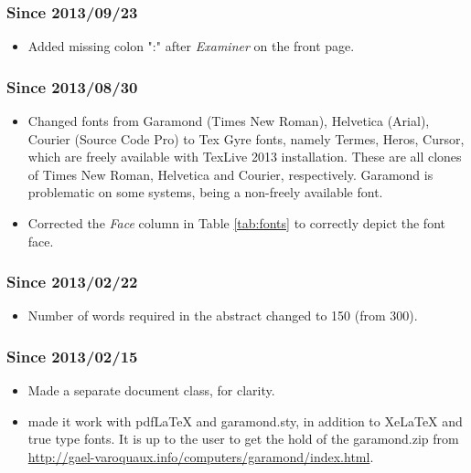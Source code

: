 \documentclass{cslthse-msc}
\begin{document}
\begin{appendices}
\subsubsection{Since 2013/09/23}
\begin{itemize}
\item Added missing colon ":" after \textit{Examiner} on the front page. 
\end{itemize}

\subsubsection{Since 2013/08/30}
\begin{itemize}
\item Changed fonts from Garamond (Times New Roman), Helvetica (Arial), Courier (Source Code Pro) to Tex Gyre fonts, namely Termes, Heros, Cursor, which are freely available with TexLive 2013 installation. These are all clones of Times New Roman, Helvetica and Courier, respectively. Garamond is problematic on some systems, being a non-freely available font.
\item Corrected the \textit{Face} column in Table \ref{tab:fonts} to correctly depict the font face.
\end{itemize}

\subsubsection{Since 2013/02/22}
\begin{itemize}
\item Number of words required in the abstract changed to 150 (from 300).
\end{itemize}

\subsubsection{Since 2013/02/15}
\begin{itemize}
\item Made a separate document class, for clarity.
\item made it work with pdfLaTeX and garamond.sty, in addition to XeLaTeX and true type fonts. It is up to the user to get the hold of the garamond.zip from \url{http://gael-varoquaux.info/computers/garamond/index.html}.
\end{itemize}


\end{appendices}
\end{document}
